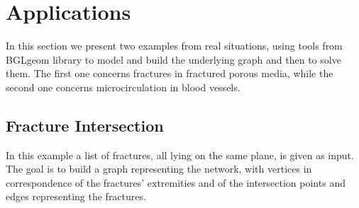 \documentclass[10pt]{article} %
\begin{document}
	\section{Applications}
	In this section we present two examples from real situations, using tools from BGLgeom library to model and build the underlying graph and then to solve them. The first one concerns fractures in fractured porous media, while the second one concerns microcirculation in blood vessels.
	
	\subsection{Fracture Intersection}
	In this example a list of fractures, all lying on the same plane, is given as input. The goal is to build a graph representing the network, with vertices in correspondence of the fractures' extremities and of the intersection points and edges representing the fractures.
	
\end{document}
